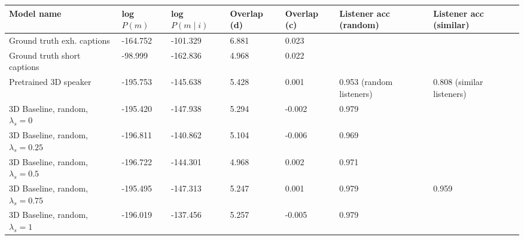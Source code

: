\begin{table}[]
	\begin{tabularx}{\textwidth}{|X|l|l|X|X|X|X|}
		\hline
		\textbf{Model name}                                    & \textbf{log $P(m)$} & \textbf{log $P(m \mid i)$} & \textbf{Overlap (d)} & \textbf{Overlap (c)} & \textbf{Listener acc (random)} & \textbf{Listener acc (similar)} \\ \hline
		Ground truth exh. captions       &      -164.752            &         -101.329               &       6.881             &      0.023               &                 &                \\ \hline
		Ground truth short captions       &     -98.999            &    -162.836              &      4.968         &      0.022           &                 &                \\ \hline
		Pretrained 3D speaker                            &       -195.753            &         -145.638               &        5.428              &      0.001                & 0.953 (random listeners)                 & 0.808 (similar listeners)                 \\ \hline
		3D Baseline, random, $\lambda_s = 0$ &       -195.420            &    -147.938                    &           5.294            &      -0.002                &                 0.979                         &                                           \\ \hline
		3D Baseline, random, $\lambda_s = 0.25$     &     -196.811              &       -140.862                 &          5.104            &       -0.006               &          0.969                                &                                           \\ \hline
		3D Baseline, random, $\lambda_s = 0.5$   &         -196.722          &        -144.301                &        4.968              &          0.002            &                  0.971                      &                                           \\ \hline
		3D Baseline, random, $\lambda_s = 0.75$  &       -195.495        &           -147.313           &          5.247            &         0.001             & 0.979                                    &                        0.959                   \\ \hline
		3D Baseline, random, $\lambda_s = 1$   &      -196.019             &            -137.456             &        5.257              &          -0.005            &              0.979                            &                                           \\ \hline

\end{tabularx}
\end{table}
